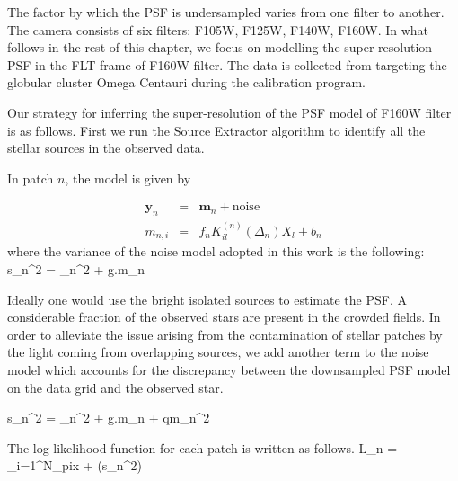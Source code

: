 The factor by which the PSF is undersampled varies from one filter to another.
The \wfc camera consists of six filters: F105W, F125W, F140W, F160W. In what follows in the rest of this chapter, we focus on modelling the super-resolution PSF in the FLT frame of F160W filter. The data is collected from targeting the globular cluster Omega Centauri during the calibration program.

Our strategy for inferring the super-resolution of the PSF model of F160W filter is as follows. 
First we run the Source Extractor algorithm to identify all the stellar sources in the observed data. 

In patch $n$, the model is given by

\begin{eqnarray}
\mathbf{y}_{n} &=&  \mathbf{m}_{n} + \mathrm{noise} \\
m_{n,i} &=& f_{n}K^{(n)}_{il} (\Delta_n) X_{l} + b_{n} 
\end{eqnarray} 
where the variance of the noise model adopted in this work is the following:
\beq
s_n^2 = \sigma_{n}^{2} + g.m_{n}
\eeq    

Ideally one would use the bright isolated sources to estimate the PSF. A considerable fraction of the observed stars are present in the crowded fields. 
In order to alleviate the issue arising from the contamination of stellar patches by the light coming from overlapping sources, we add another term to the noise model which accounts for the discrepancy between the downsampled PSF model on the data grid and the observed star. 

\beq
s_n^2 = \sigma_{n}^{2} + g.m_{n} + qm_{n}^{2}
\eeq 


The log-likelihood function for each patch is written as follows. 
 \ln L_{n} = \sum_{i=1}^{N_{\rm pix}}  + \ln(s_{n}^{2})
\eeq




